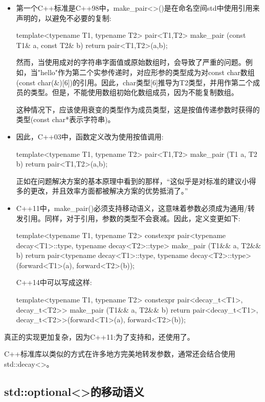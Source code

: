 \begin{itemize}
\item 第一个C++标准是C++98中，make_pair<>()是在命名空间std中使用引用来声明的，以避免不必要的复制:
\begin{cppcode}
template<typename T1, typename T2>
pair<T1,T2> make_pair (const T1& a, const T2& b)
{
	return pair<T1,T2>(a,b);
}
\end{cppcode}
然而，当使用成对的字符串字面值或原始数组时，会导致了严重的问题。例如，当"hello"作为第二个实参传递时，对应形参的类型成为对const char数组(const char(\&)[6])的引用。因此，char类型[6]推导为T2类型，并用作第二个成员的类型。但是，不能使用数组初始化数组成员，因为不能复制数组。

这种情况下，应该使用衰变的类型作为成员类型，这是按值传递参数时获得的类型(const char*表示字符串)。

\item 因此，C++03中，函数定义改为使用按值调用:
\begin{cppcode}
template<typename T1, typename T2>
pair<T1,T2> make_pair (T1 a, T2 b)
{
	return pair<T1,T2>(a,b);
}
\end{cppcode}
正如在问题解决方案的基本原理中看到的那样，“这似乎是对标准的建议小得多的更改，并且效率方面都被解决方案的优势抵消了。”

\item C++11中，make_pair()必须支持移动语义，这意味着参数必须成为通用/转发引用。同样，对于引用，参数的类型不会衰减。因此，定义变更如下:
\begin{cppcode}
template<typename T1, typename T2>
constexpr pair<typename decay<T1>::type, typename decay<T2>::type>
make_pair (T1&& a, T2&& b)
{
	return pair<typename decay<T1>::type,
	typename decay<T2>::type>(forward<T1>(a),
	forward<T2>(b));
}
\end{cppcode}
C++14中可以写成这样:
\begin{cppcode}
template<typename T1, typename T2>
constexpr pair<decay_t<T1>, decay_t<T2>>
make_pair (T1&& a, T2&& b)
{
	return pair<decay_t<T1>, decay_t<T2>>(forward<T1>(a), forward<T2>(b));
}
\end{cppcode}
\end{itemize}

真正的实现更加复杂，因为C++11:为了支持和，还使用了。

C++标准库以类似的方式在许多地方完美地转发参数，通常还会结合使用std::decay<>。

\subsection{std::optional<>的移动语义}

